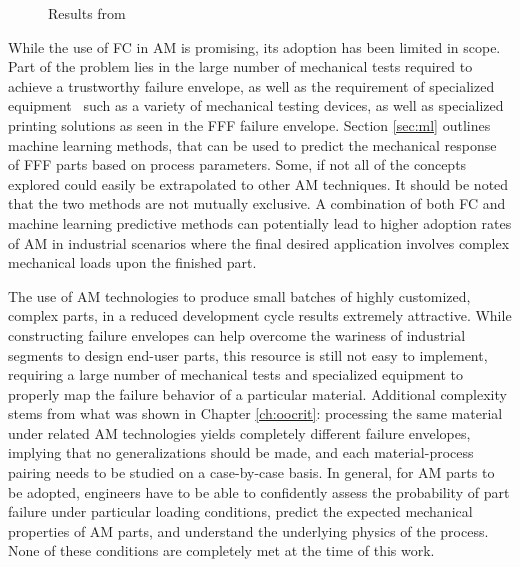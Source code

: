 \documentclass[main.tex]{subfiles}
\begin{document}
\begin{figure}[!htbp]
	\center
	\hfill
	\caption{Results from \cite{MazzeiJCompSci}} \label{fig:jcompscir}
\end{figure} 

While the use of FC in AM is promising, its adoption has been limited in scope. Part of the problem lies in the large number of mechanical tests required to achieve a trustworthy failure envelope, as well as the requirement of specialized equipment \textendash~such as a variety of mechanical testing devices, as well as specialized printing solutions as seen in the FFF failure envelope. Section \ref{sec:ml} outlines  machine learning methods, that can be used to predict the mechanical response of FFF parts based on process parameters. Some, if not all of the concepts explored could easily be extrapolated to other AM techniques. It should be noted that the two methods are not mutually exclusive. A combination of both FC and machine learning predictive methods can potentially lead to higher adoption rates of AM in industrial scenarios where the final desired application involves complex mechanical loads upon the finished part.

The use of AM technologies to produce small batches of highly customized, complex parts, in a reduced development cycle results extremely attractive. While constructing failure envelopes can help overcome the wariness of industrial segments to design end-user parts, this resource is still not easy to implement, requiring a large number of mechanical tests and specialized equipment to properly map the failure behavior of a particular material. Additional complexity stems from what was shown in Chapter \ref{ch:oocrit}: processing the same material under related AM technologies yields completely different failure envelopes, implying that no generalizations should be made, and each material-process pairing needs to be studied on a case-by-case basis. In general, for AM parts to be adopted, engineers have to be able to confidently assess the probability of part failure under particular loading conditions, predict the expected mechanical properties of AM parts, and understand the underlying physics of the process. None of these conditions are completely met at the time of this work.
\end{document}
